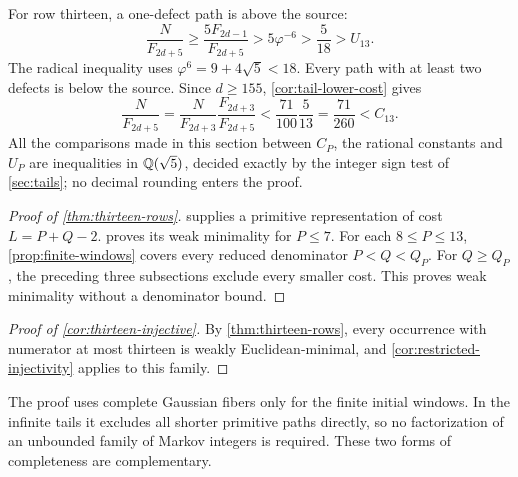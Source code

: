 For row thirteen, a one-defect path is above the source:
$$
 \frac{N}{F_{2d+5}}\geqslant\frac{5F_{2d-1}}{F_{2d+5}}
 >5\varphi^{-6}>\frac5{18}>U_{13}.
$$
The radical inequality uses $\varphi^6=9+4\sqrt5<18$.
Every path with at least two defects is below the source. Since
$d\geqslant155$, \cref{cor:tail-lower-cost} gives
$$
 \frac{N}{F_{2d+5}}
 =\frac{N}{F_{2d+3}}\frac{F_{2d+3}}{F_{2d+5}}
 <\frac{71}{100}\frac5{13}
 =\frac{71}{260}<C_{13}.
$$
All the comparisons made in this section between $C_P$, the rational
constants and $U_P$ are inequalities in $\mathbb{Q}(\sqrt5)$, decided exactly by
the integer sign test of \cref{sec:tails}; no decimal rounding enters the
proof.

\begin{proof}[Proof of \cref{thm:thirteen-rows}]
 supplies a primitive representation
of cost $L=P+Q-2$.  proves its weak
minimality for $P\leqslant7$. For each $8\leqslant P\leqslant13$,
\cref{prop:finite-windows} covers every reduced denominator
$P<Q<Q_P$. For $Q\geqslant Q_P$, the preceding three subsections
exclude every smaller cost. This proves weak minimality without a
denominator bound.
\end{proof}

\begin{proof}[Proof of \cref{cor:thirteen-injective}]
By \cref{thm:thirteen-rows}, every occurrence with numerator at most
thirteen is weakly Euclidean-minimal, and \cref{cor:restricted-injectivity}
applies to this family.
\end{proof}

The proof uses complete Gaussian fibers only for the finite initial
windows. In the infinite tails it excludes all shorter primitive paths
directly, so no factorization of an unbounded family of Markov integers
is required. These two forms of completeness are complementary.
